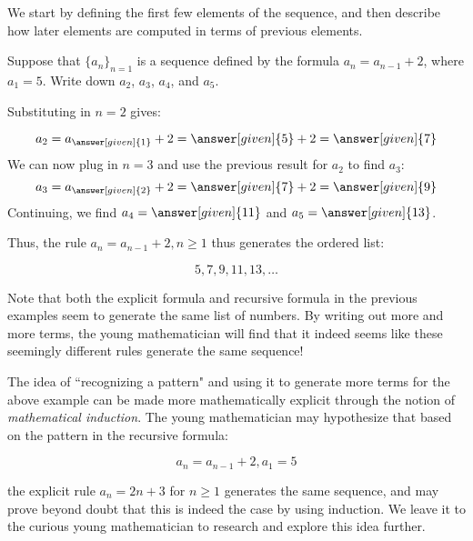 \documentclass{ximera}
\begin{document}
We start by defining the first few elements of the sequence, and then describe how later elements are computed in terms of previous elements.

\begin{example}
 Suppose that $\{a_n\}_{n=1}$ is a sequence defined by the formula $a_n = a_{n-1}+2$, where $a_1 = 5$.  Write down $a_2$, $a_3$, $a_4$, and $a_5$.
 
 \begin{explanation}
 Substituting in $n=2$ gives:
 
 \[
 a_2 = a_{\answer[given]{1}}+2 = \answer[given]{5}+2 = \answer[given]{7}
 \]
 We can now plug in $n=3$ and use the previous result for $a_2$ to find $a_3$:
  \[
 a_3 = a_{\answer[given]{2}}+2 = \answer[given]{7}+2 = \answer[given]{9}
 \]
 Continuing, we find $a_4 = \answer[given]{11}$ and $a_5 = \answer[given]{13}$.
 
 Thus, the rule $a_n = a_{n-1}+2, n \geq 1$ thus generates the ordered list:

\[
5,7,9,11,13, \dots
\]   

 \end{explanation}
\end{example}

Note that both the explicit formula and recursive formula in the previous examples seem to generate the same list of numbers.  By writing out more and more terms, the young mathematician will find that it indeed seems like these seemingly different rules generate the same sequence!  

  \begin{remark}
  The idea of ``recognizing a pattern" and using it to generate more terms for the above example can be made more mathematically explicit through the notion of \emph{mathematical induction}.  The young mathematician may hypothesize that based on the pattern in the recursive formula:
  
  \[
  a_n = a_{n-1}+2, a_1 = 5
  \]
  
  the explicit rule $a_n = 2n+3$ for $n \geq 1$ generates the same sequence, and may prove beyond doubt that this is indeed the case by using induction.  We leave it to the curious young mathematician to research and explore this idea further.
  \end{remark}
  
  
  
  
\end{document}
